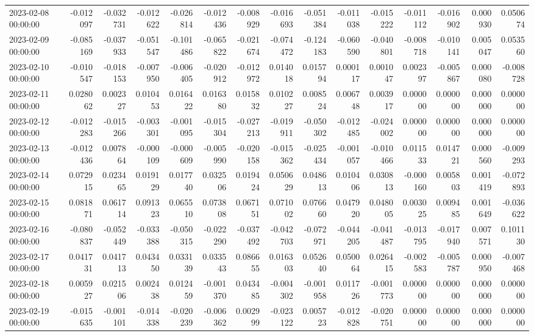 \begin{tabular}{lrrrrrrrrrrrrrr}
2023-02-08 00:00:00 & -0.012097 & -0.032731 & -0.012622 & -0.026814 & -0.012436 & -0.008929 & -0.016693 & -0.051384 & -0.011038 & -0.015222 & -0.011112 & -0.016902 & 0.000930 & 0.050674 \\
2023-02-09 00:00:00 & -0.085169 & -0.037933 & -0.051547 & -0.101486 & -0.065822 & -0.021674 & -0.074472 & -0.124183 & -0.060590 & -0.040801 & -0.008718 & -0.010141 & 0.005047 & 0.053560 \\
2023-02-10 00:00:00 & -0.010547 & -0.018153 & -0.007950 & -0.006405 & -0.020912 & -0.012972 & 0.014018 & 0.015794 & 0.000117 & 0.001047 & 0.002397 & -0.005867 & 0.000080 & -0.008728 \\
2023-02-11 00:00:00 & 0.028062 & 0.002327 & 0.010453 & 0.016422 & 0.016380 & 0.015832 & 0.010227 & 0.008524 & 0.006748 & 0.003917 & 0.000000 & 0.000000 & 0.000000 & 0.000000 \\
2023-02-12 00:00:00 & -0.012283 & -0.015266 & -0.003301 & -0.001095 & -0.015304 & -0.027213 & -0.019911 & -0.050302 & -0.012485 & -0.024002 & 0.000000 & 0.000000 & 0.000000 & 0.000000 \\
2023-02-13 00:00:00 & -0.012436 & 0.007864 & -0.000109 & -0.000609 & -0.005990 & -0.020158 & -0.015362 & -0.025434 & -0.001057 & -0.010466 & 0.011533 & 0.014721 & 0.000560 & -0.009293 \\
2023-02-14 00:00:00 & 0.072915 & 0.023465 & 0.019129 & 0.017740 & 0.032506 & 0.019424 & 0.050629 & 0.048613 & 0.010406 & 0.030813 & -0.000160 & 0.005803 & 0.001419 & -0.072893 \\
2023-02-15 00:00:00 & 0.081871 & 0.061714 & 0.091323 & 0.065510 & 0.073808 & 0.067151 & 0.071002 & 0.076660 & 0.047920 & 0.048005 & 0.003025 & 0.009485 & 0.001649 & -0.036622 \\
2023-02-16 00:00:00 & -0.080837 & -0.052449 & -0.033388 & -0.050315 & -0.022290 & -0.037492 & -0.042703 & -0.072971 & -0.044205 & -0.041487 & -0.013795 & -0.017940 & 0.007571 & 0.101130 \\
2023-02-17 00:00:00 & 0.041731 & 0.041713 & 0.043450 & 0.033139 & 0.033543 & 0.086655 & 0.016303 & 0.052640 & 0.050064 & 0.026415 & -0.002583 & -0.005787 & 0.000950 & -0.007468 \\
2023-02-18 00:00:00 & 0.005927 & 0.021506 & 0.002438 & 0.012459 & -0.001370 & 0.043485 & -0.004302 & -0.001958 & 0.011726 & -0.001773 & 0.000000 & 0.000000 & 0.000000 & 0.000000 \\
2023-02-19 00:00:00 & -0.015635 & -0.001101 & -0.014338 & -0.020239 & -0.006362 & 0.002999 & -0.023122 & 0.005723 & -0.012828 & -0.020751 & 0.000000 & 0.000000 & 0.000000 & 0.000000 \\

\end{tabular}
